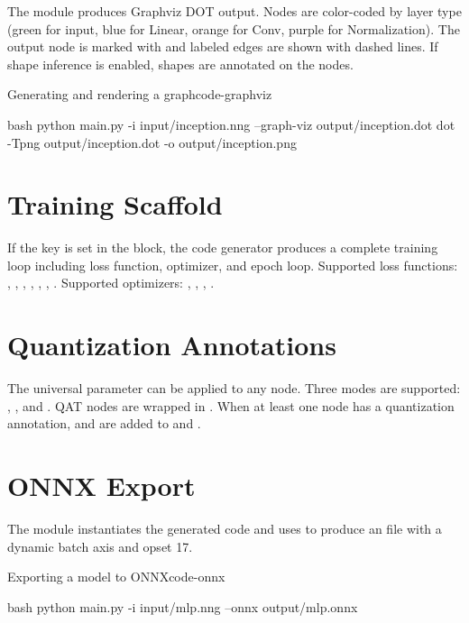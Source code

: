 \documentclass{nngraph-en}
\begin{document}
The  module produces Graphviz DOT output. Nodes
are color-coded by layer type (green for input, blue for Linear,
orange for Conv, purple for Normalization). The output node is
marked with  and labeled edges are shown with
dashed lines. If shape inference is enabled, shapes are annotated
on the nodes.

\begin{codebox}{Generating and rendering a graph}{code-graphviz}
\begin{amzcode}{bash}
python main.py -i input/inception.nng --graph-viz output/inception.dot
dot -Tpng output/inception.dot -o output/inception.png
\end{amzcode}
\end{codebox}

\section{Training Scaffold}

If the  key is set in the  block, the code
generator produces a complete training loop including loss function,
optimizer, and epoch loop. Supported loss functions:
, , ,
, , ,
. Supported optimizers:
, , , .

\section{Quantization Annotations}

The universal  parameter can be applied to any node.
Three modes are supported: , , and
. QAT nodes are wrapped in
. When at least one node has
a quantization annotation,  and 
are added to  and .

\section{ONNX Export}

The  module instantiates the generated code
and uses  to produce an  file
with a dynamic batch axis and opset 17.

\begin{codebox}{Exporting a model to ONNX}{code-onnx}
\begin{amzcode}{bash}
python main.py -i input/mlp.nng --onnx output/mlp.onnx
\end{amzcode}
\end{codebox}
\end{document}
